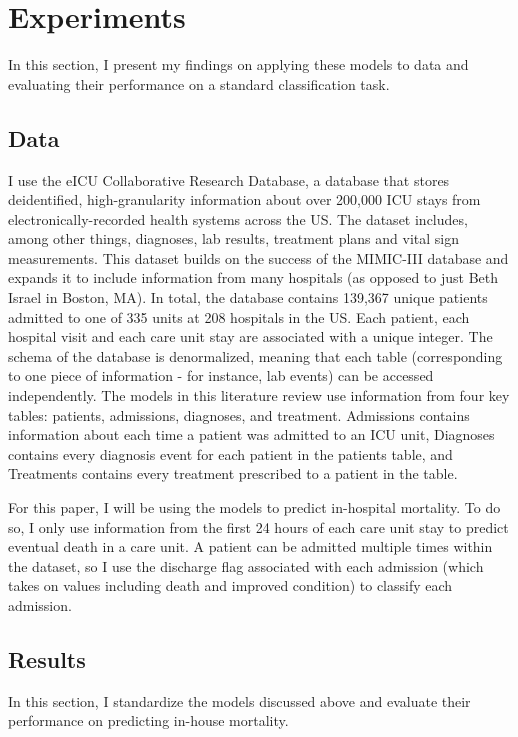\documentclass{article}
\begin{document}
    
\section{Experiments}
In this section, I present my findings on applying these models to data and evaluating their performance on a standard classification task. 
\subsection{Data}
I use the eICU Collaborative Research Database, a database that stores deidentified, high-granularity information about over 200,000 ICU stays from electronically-recorded health systems across the US. The dataset includes, among other things, diagnoses, lab results, treatment plans and vital sign measurements. This dataset builds on the success of the MIMIC-III database and expands it to include information from many hospitals (as opposed to just Beth Israel in Boston, MA). In total, the database contains 139,367 unique patients admitted to one of 335 units at 208 hospitals in the US. Each patient, each hospital visit and each care unit stay are associated with a unique integer. The schema of the database is denormalized, meaning that each table (corresponding to one piece of information - for instance, lab events) can be accessed independently. The models in this literature review use information from four key tables: patients, admissions, diagnoses, and treatment. Admissions contains information about each time a patient was admitted to an ICU unit, Diagnoses contains every diagnosis event for each patient in the patients table, and Treatments contains every treatment prescribed to a patient in the table. 

For this paper, I will be using the models to predict in-hospital mortality. To do so, I only use information from the first 24 hours of each care unit stay to predict eventual death in a care unit. A patient can be admitted multiple times within the dataset, so I use the discharge flag associated with each admission (which takes on values including death and improved condition) to classify each admission. 

\subsection{Results}
\label{results-comp}
 
In this section, I standardize the models discussed above and evaluate their performance on predicting in-house mortality.
 
\end{document}
